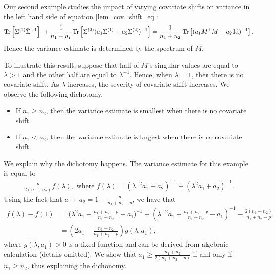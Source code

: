 \begin{example}\label{ex_covshift}
Our second example studies the impact of varying covariate shifts on variance in the left hand side of equation \eqref{lem_cov_shift_eq}:
	\[ \operatorname{Tr}\left[\Sigma^{(2)} \hat{\Sigma}^{-1}\right] \rightarrow \frac{1}{n_1 + n_2} \operatorname{Tr}\left[\Sigma^{(2)} (a_1 \Sigma^{(1)} + a_2 \Sigma^{(2)})^{-1}\right]= \frac{1}{n_1 + n_2} \operatorname{Tr}\left[(a_1 M^{\top} M + a_2 \operatorname{Id})^{-1}\right]. \]
Hence the variance estimate is determined by the spectrum of $M$.

To illustrate this result, suppose that half of $M$'s singular values are equal to $\lambda > 1$ and the other half are equal to $\lambda^{-1}$.
Hence, when $\lambda = 1$, then there is no covariate shift.
As $\lambda$ increases, the severity of covariate shift increases.
We observe the following dichotomy.
\begin{itemize}
	\item If $n_1 \ge n_2$, then the variance estimate is smallest when there is no covariate shift.
	\item If $n_1 < n_2$, then the variance estimate is largest when there is no covariate shift.
\end{itemize}
\end{example}
We explain why the dichotomy happens. The variance estimate for this example is equal to
\begin{align*}
	\frac{p}{2(n_1 + n_2)} f(\lambda), \text{ where } f(\lambda) = {(\lambda^{-2} a_1 + a_2)^{-1} + (\lambda^2 a_1 + a_2)^{-1}}.
\end{align*}
Using the fact that $a_1 + a_2 = 1 - \frac{p}{n_1 + n_2 - p}$, we have that
\begin{align*}
	f(\lambda) - f(1) &= {(\lambda^2 a_1 + \frac{n_1 + n_2 - p}{n_1 + n_2} - a_1})^{-1}
	+ (\lambda^{-2} a_1 + \frac{n_1 + n_2 - p}{n_1 + n_2} - a_1)^{-1}  - \frac{2(n_1 + n_2)}{n_1 + n_2 - p} \\
	&= (2a_1 - \frac{n_1 + n_2} {n_1 + n_2 - p}) g(\lambda, a_1),
\end{align*}
where $g(\lambda, a_1) > 0$ is a fixed function and can be derived from algebraic calculation (details omitted).
We show that $a_1 \ge \frac{n_1 + n_2}{2(n_1 + n_2 - p)}$ if and only if $n_1 \ge n_2$, thus explaining the dichonomy.

